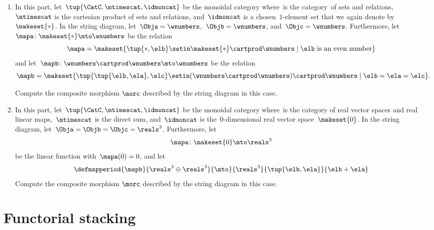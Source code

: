 \begin{gradedexercise}
\begin{enumerate}
        \item In this part, let~$\tup{\CatC,\mtimescat,\idmoncat}$ be the monoidal category where~\CatC is the category~\Rel of sets and relations,~$\mtimescat$ is the cartesian product of sets and relations, and~$\idmoncat$ is a chosen~$1$-element set that we again denote by~$\makeset{*}$.
              In the string diagram, let~$\Obja = \wnumbers$,~$\Objb = \wnumbers$, and~$\Objc = \wnumbers$.
              Furthermore, let~$\mapa\colon \makeset{*} \mto \wnumbers$ be the relation
              \begin{equation}
                  \mapa = \makeset{ \tup{*, \elb} \setin \makeset{*} \cartprod \wnumbers \mid \elb \text{ is an even number}}
              \end{equation}
              and let~$\mapb \colon \wnumbers \cartprod \wnumbers \mto \wnumbers$ be the relation
              \begin{equation}
                  \mapb = \makeset{ \tup{\tup{\elb, \ela}, \elc} \setin (\wnumbers \cartprod \wnumbers) \cartprod \wnumbers \mid \elb = \ela = \elc}.
              \end{equation}

              Compute the composite morphism $\morc$ described by the string diagram in this case.

        \item In this part, let~$\tup{\CatC,\mtimescat,\idmoncat}$ be the monoidal category where~\CatC is the category of real vector spaces and real linear maps,~$\mtimescat$ is the direct sum, and~$\idmoncat$ is the~$0$-dimensional real vector space~$\makeset{0}$.
              In the string diagram, let~$\Obja = \Objb = \Objc = \reals^3$.
              Furthermore, let
              \begin{equation}
                  \mapa\colon \makeset{0} \mto \reals^3
              \end{equation}
              be the linear function with~$\mapa(0) = 0$, and let
              \begin{equation}
                \defmapperiod{\mapb}{\reals^3\oplus \reals^3}{\mto}{\reals^3}{\tup{\elb,\ela}}{\elb+\ela}
              \end{equation}
              Compute the composite morphism $\morc$ described by the string diagram in this case.
    \end{enumerate}
\end{gradedexercise}

\section{Functorial stacking}
\label{sec:functorial-stacking}

